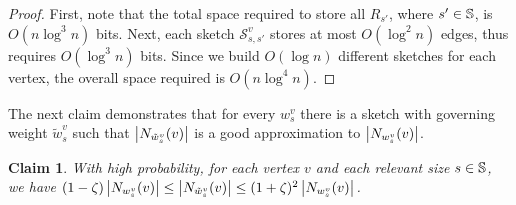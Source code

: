 \documentclass{article}
\newtheorem{claim}[theorem]{Claim}
\newcommand{\Sk}{{\mathcal{S}}}
\begin{document}
\begin{proof}
First, note that the total space required to store all \( R_{s'} \), where \( s' \in \mathbb{S} \), is \( O(n\log^3 n) \) bits. Next, each sketch \({\Sk}^{v}_{s,s'}\) stores at most \( O(\log^2 n) \) edges, thus requires \( O(\log^3 n) \) bits. Since we build \( O(\log n) \) different sketches for each vertex, the overall space required is \( O(n\log^4 n) \).
\end{proof}

The next claim demonstrates that for every $w^v_s$ there is a sketch with governing weight $\tilde{w}^v_s$ such that $\left|N_{\tilde{w}^v_s}(v)\right|$ is a good approximation to $\left|N_{w^v_s}(v)\right|$.

\begin{claim}
\label{clm:sketch1nb}
With high probability, for each vertex \(v\) and each relevant size \(s \in \mathbb{S} \), we have \( (1-\zeta)\left|N_{w^v_s}(v)\right| \leq \left|N_{\tilde{w}^v_s}(v)\right| \leq (1+\zeta)^2\left|N_{w^v_s}(v)\right| \).
\end{claim}
\end{document}
